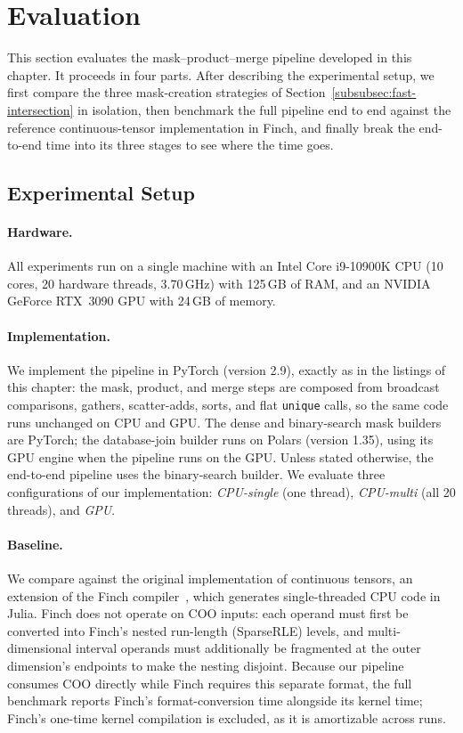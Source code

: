 \section{Evaluation}
\label{sec:eval}

This section evaluates the mask--product--merge pipeline developed in
this chapter. It proceeds in four parts. After describing the
experimental setup, we first compare the three mask-creation
strategies of Section~\ref{subsubsec:fast-intersection} in isolation,
then benchmark the full pipeline end to end against the reference
continuous-tensor implementation in Finch, and finally break the
end-to-end time into its three stages to see where the time goes.

\subsection{Experimental Setup}
\label{subsec:eval-setup}

\paragraph{Hardware.}
All experiments run on a single machine with an Intel Core i9-10900K
CPU (10 cores, 20 hardware threads, 3.70\,GHz) with 125\,GB of RAM,
and an NVIDIA GeForce RTX~3090 GPU with 24\,GB of memory.

\paragraph{Implementation.}
We implement the pipeline in PyTorch (version 2.9), exactly as in the
listings of this chapter: the mask, product, and merge steps are
composed from broadcast comparisons, gathers, scatter-adds, sorts, and
flat \texttt{unique} calls, so the same code runs unchanged on CPU and
GPU. The dense and binary-search mask builders are PyTorch; the
database-join builder runs on Polars (version 1.35), using its GPU
engine when the pipeline runs on the GPU. Unless stated otherwise, the
end-to-end pipeline uses the binary-search builder. We evaluate three
configurations of our implementation: \emph{CPU-single} (one thread),
\emph{CPU-multi} (all 20 threads), and \emph{GPU}.

\paragraph{Baseline.}
We compare against the original implementation of continuous tensors,
an extension of the Finch compiler~\cite{finch}, which generates
single-threaded CPU code in Julia. Finch does not operate on COO
inputs: each operand must first be converted into Finch's nested
run-length (SparseRLE) levels, and multi-dimensional interval operands
must additionally be fragmented at the outer dimension's endpoints to
make the nesting disjoint. Because our pipeline consumes COO directly
while Finch requires this separate format, the full benchmark reports
Finch's format-conversion time alongside its kernel time; Finch's
one-time kernel compilation is excluded, as it is amortizable across
runs.

